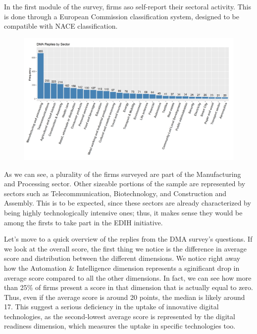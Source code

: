 \documentclass[12pt]{report}
\begin{document}
\par In the first module of the survey, firms aso self-report their sectoral activity. This is done through a European Commission classification system, designed to be compatible with NACE classification.
\begin{figure}[h!]
    \centering
    \includegraphics[width=\linewidth]{../Output/dmasectorsbargraph.png}
    \caption{}
    \label{fig:distr_sector}
\end{figure}

\par As we can see, a plurality of the firms surveyed are part of the Manufacturing and Processing sector. Other sizeable portions of the sample are represented by sectors such as Telecommunication, Biotechnology, and Construction and Assembly. This is to be expected, since these sectors are already characterized by being highly technologically intensive ones; thus, it makes sense they would be among the firsts to take part in the EDIH initiative.


\par Let's move to a quick overview of the replies from the DMA survey's questions. If we look at the overall score, the first thing we notice is the difference in average score and distribution between the different dimensions. We notice right away how the Automation \& Intelligence dimension represents a sginificant drop in average score compared to all the other dimensions. In fact, we can see how more than 25\% of firms present a score in that dimension that is actually equal to zero. Thus, even if the average score is around 20 points, the median is likely around 17. This suggest a serious deficiency in the uptake of innovative digital technologies, as the second-lowest average score is represented by the digital readiness dimension, which measures the uptake in specific technologies too.
\end{document}
